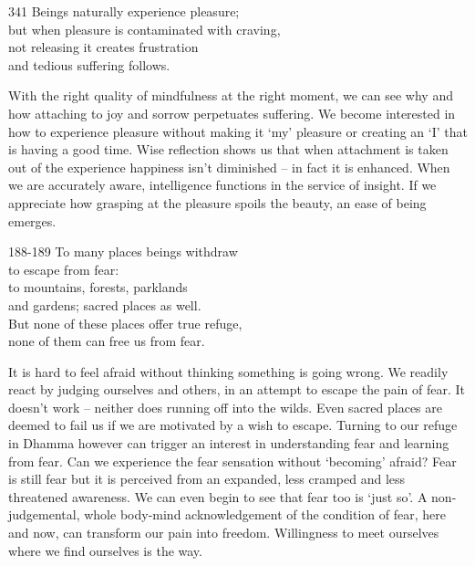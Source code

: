 
\begin{dhpVerse}{341}
\label{dhp-341}
Beings naturally experience pleasure;\\
but when pleasure is contaminated with craving,\\
not releasing it creates frustration\\
and tedious suffering follows.
\end{dhpVerse}

\begin{dhpRefl}

With the right quality of mindfulness at the right moment, we can see
why and how attaching to joy and sorrow perpetuates suffering. We
become interested in how to experience pleasure without making it
`my' pleasure or creating an `I' that is having a good time. Wise
reflection shows us that when attachment is taken out of the
experience happiness isn't diminished -- in fact it is enhanced. When
we are accurately aware, intelligence functions in the service of
insight. If we appreciate how grasping at the pleasure spoils the
beauty, an ease of being emerges.

\end{dhpRefl}


\begin{dhpVerse}{188-189}
\label{dhp-188}\label{dhp-189}
To many places beings withdraw\\
to escape from fear:\\
to mountains, forests, parklands\\
and gardens; sacred places as well.\\
But none of these places offer true refuge,\\
none of them can free us from fear.
\end{dhpVerse}

\begin{dhpRefl}

It is hard to feel afraid without thinking something is going wrong.
We readily react by judging ourselves and others, in an attempt to
escape the pain of fear. It doesn't work -- neither does running off
into the wilds. Even sacred places are deemed to fail us if we are
motivated by a wish to escape. Turning to our refuge in Dhamma
however can trigger an interest in understanding fear and learning
from fear. Can we experience the fear sensation without `becoming'
afraid? Fear is still fear but it is perceived from an expanded, less
cramped and less threatened awareness. We can even begin to see that
fear too is `just so'. A non-judgemental, whole body-mind
acknowledgement of the condition of fear, here and now, can transform
our pain into freedom. Willingness to meet ourselves where we find
ourselves is the way.

\end{dhpRefl}

